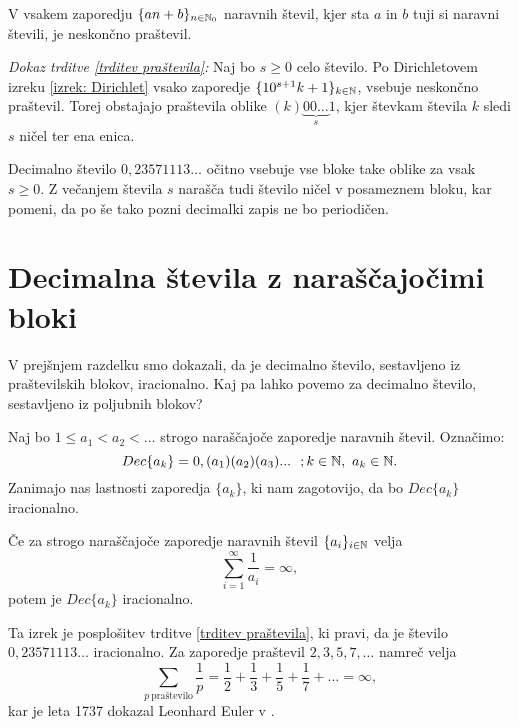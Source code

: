 \documentclass[twoside,11pt]{article}
\begin{document}
\begin{izrek}\label{izrek: Dirichlet}
    V vsakem zaporedju $ \lbrace an + b \rbrace_{n \in \mathbb{N}_0}$ naravnih števil, kjer sta $a$ in $b$
    tuji si naravni števili, je neskončno praštevil.
\end{izrek}

\noindent
{\em Dokaz trditve \ref{trditev praštevila}:\/} Naj bo $s \geq 0$ celo število. 
Po Dirichletovem izreku \ref{izrek: Dirichlet} vsako zaporedje
$ \{10^{s+1}k + 1\}_{k \in \mathbb{N}}$,  vsebuje neskončno praštevil. Torej obstajajo praštevila
oblike $(k)\underbrace{00 \dots}_{s}1$, kjer števkam števila $k$ sledi $s$ ničel ter ena enica. 

Decimalno število $0,23571113\dots$ očitno vsebuje vse bloke take oblike za vsak $s \geq 0$. Z večanjem števila
$s$ narašča tudi število ničel v posameznem bloku, kar pomeni, da po še tako pozni decimalki zapis ne bo periodičen.

\QED


\section{Decimalna števila z naraščajočimi bloki}

V prejšnjem razdelku smo dokazali, da je decimalno število, sestavljeno iz praštevilskih
blokov, iracionalno. Kaj pa lahko povemo za decimalno število, sestavljeno iz poljubnih blokov?

Naj bo $1 \leq a_1 < a_2 < \dots $ strogo naraščajoče zaporedje naravnih števil. 
Označimo: \[Dec\{a_k\} = 0,(a_1)(a_2)(a_3)... \  \ ; k \in \mathbb{N}, \ a_k \in \mathbb{N} . \]
Zanimajo nas lastnosti zaporedja $\{a_k\}$, ki nam zagotovijo, da bo $Dec\{a_k\}$ iracionalno.

\begin{izrek}\label{irac1}
    
    Če za strogo naraščajoče zaporedje naravnih števil $\{a_i\}_{i \in \mathbb{N}}$ velja 
    \[ \sum_{i=1}^{\infty} \frac{1}{a_i} = \infty ,\]
    potem je $Dec\{a_k\}$ iracionalno.
\end{izrek}

Ta izrek je posplošitev trditve \ref{trditev praštevila}, ki pravi, da je število $0,23571113 \dots$
iracionalno. Za zaporedje praštevil $2, 3, 5, 7, \dots$ namreč velja
\[
    \sum_{p \ \text{praštevilo}}\frac{1}{p} = \frac{1}{2} + \frac{1}{3} + \frac{1}{5} + \frac{1}{7} + \dots = \infty ,\]
kar je leta 1737 dokazal Leonhard Euler v \cite{Eul}.
\end{document}
